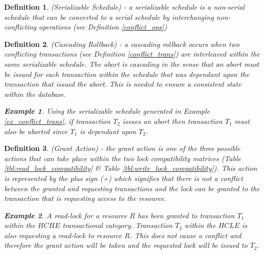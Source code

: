 \documentclass[conference]{IEEEtran}
\newtheorem{definition}{Definition}
\newtheorem{example}{Example}[definition]
\begin{document}
\begin{definition}
\label{serial_sched}
 (Serializable Schedule) - a serializable schedule is a non-serial schedule that can be converted to a serial schedule by interchanging non-conflicting operations (see Definition \ref{conflict_ops})

\end{definition}

\begin{definition}
\label{casc_rollback}
 (Cascading Rollback) - a cascading rollback occurs when two conflicting transactions (see Definition                     \ref{conflict_trans}) are interleaved within the same serializable schedule. The abort is cascading in the sense that an  abort must be issued for each transaction within the schedule that was dependant upon the transaction that issued the abort. This is needed to ensure a consistent state within the database.
 
 \begin{example}
 \label{ex_casc_rollback}
  Using the serializable schedule generated in Example \ref{ex_conflict_trans}, if transaction $T_{2}$ issues an abort then  transaction $T_{1}$ must also be aborted since $T_{1}$ is dependant upon $T_{2}$.
 \end{example}
 
\end{definition}

\begin{definition}
\label{grant_action}
 (Grant Action) - the grant action is one of the three possible actions that can take place within the two lock compatibility matrices (Table \ref{tbl:read_lock_compatibility} \& Table \ref{tbl:write_lock_compatibility}). This action is represented by the plus sign (+) which signifies that there is not a conflict between the granted and requesting transactions and the lock can be granted to the transaction that is requesting access to the resource.
 
 \begin{example}
 \label{ex_grant_action}
  A read-lock for a resource $R$ has been granted to transaction $T_{1}$ within the $HCHE$ transactional category. Transaction $T_{2}$ within the $HCLE$ is also requesting a read-lock to resource $R$. This does not cause a conflict and therefore the grant action will be taken and the requested lock will be issued to $T_{2}$.
 \end{example}
 
\end{definition}
\end{document}

